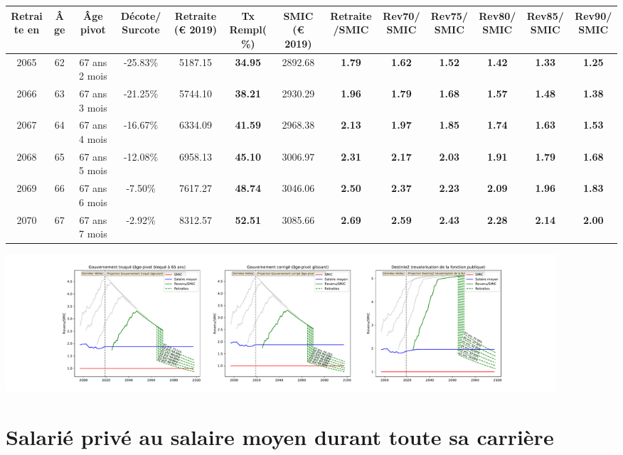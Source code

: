 { \scriptsize \begin{center} 
\begin{tabular}[htb]{|c|c||c|c||c|c||c||c|c|c|c|c|c|} 
\hline 
 Retraite en &  Âge &  Âge pivot &  Décote/Surcote &  Retraite (\euro{} 2019) &  Tx Rempl(\%) &  SMIC (\euro{} 2019) &  Retraite/SMIC &  Rev70/SMIC &  Rev75/SMIC &  Rev80/SMIC &  Rev85/SMIC &  Rev90/SMIC \\ 
\hline \hline 
 2065 &  62 &  67 ans 2 mois &  -25.83\% &  5187.15 &  {\bf 34.95} &  2892.68 &  {\bf 1.79} &  {\bf 1.62} &  {\bf 1.52} &  {\bf 1.42} &  {\bf 1.33} &  {\bf 1.25} \\ 
\hline 
 2066 &  63 &  67 ans 3 mois &  -21.25\% &  5744.10 &  {\bf 38.21} &  2930.29 &  {\bf 1.96} &  {\bf 1.79} &  {\bf 1.68} &  {\bf 1.57} &  {\bf 1.48} &  {\bf 1.38} \\ 
\hline 
 2067 &  64 &  67 ans 4 mois &  -16.67\% &  6334.09 &  {\bf 41.59} &  2968.38 &  {\bf 2.13} &  {\bf 1.97} &  {\bf 1.85} &  {\bf 1.74} &  {\bf 1.63} &  {\bf 1.53} \\ 
\hline 
 2068 &  65 &  67 ans 5 mois &  -12.08\% &  6958.13 &  {\bf 45.10} &  3006.97 &  {\bf 2.31} &  {\bf 2.17} &  {\bf 2.03} &  {\bf 1.91} &  {\bf 1.79} &  {\bf 1.68} \\ 
\hline 
 2069 &  66 &  67 ans 6 mois &  -7.50\% &  7617.27 &  {\bf 48.74} &  3046.06 &  {\bf 2.50} &  {\bf 2.37} &  {\bf 2.23} &  {\bf 2.09} &  {\bf 1.96} &  {\bf 1.83} \\ 
\hline 
 2070 &  67 &  67 ans 7 mois &  -2.92\% &  8312.57 &  {\bf 52.51} &  3085.66 &  {\bf 2.69} &  {\bf 2.59} &  {\bf 2.43} &  {\bf 2.28} &  {\bf 2.14} &  {\bf 2.00} \\ 
\hline 
\hline 
\end{tabular} 
\end{center} } 

 \begin{center}\includegraphics[width=0.9\textwidth]{fig/Magistrat_2003_22_dest_retraite.pdf}\end{center} \label{fig/Magistrat_2003_22_dest_retraite.pdf} 

\newpage 
 
\chapter{Salarié privé au salaire moyen durant toute sa carrière} 


